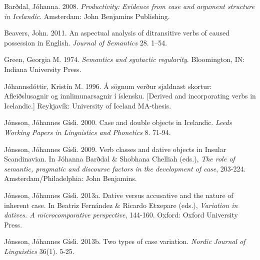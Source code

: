 \begin{styleStandard}
Barðdal, Jóhanna. 2008. \textit{Productivity: Evidence from case and argument structure in Icelandic}. Amsterdam: John Benjamins Publishing. 
\end{styleStandard}

\begin{styleStandard}
Beavers, John. 2011. An aspectual analysis of ditransitive verbs of caused possession in English. \textit{Journal of Semantics }28. 1–54.
\end{styleStandard}

\begin{styleStandard}
Green, Georgia M. 1974. \textit{Semantics and syntactic regularity}. Bloomington, IN: Indiana University Press.
\end{styleStandard}

\begin{styleStandard}
Jóhannsdóttir, Kristín M. 1996. Á sögnum verður sjaldnast skortur: Afleiðslusagnir og innlimunarsagnir í íslensku. [Derived and incorporating verbs in Icelandic.] Reykjavík: University of Iceland MA-thesis. 
\end{styleStandard}

\begin{styleStandard}
Jónsson, Jóhannes Gísli. 2000. Case and double objects in Icelandic. \textit{Leeds Working Papers in Linguistics and Phonetics }8. 71-94.
\end{styleStandard}

\begin{styleStandard}
Jónsson, Jóhannes Gísli. 2009. Verb classes and dative objects in Insular Scandinavian. In Jóhanna Barðdal \& Shobhana Chelliah (eds.),\textit{ The role of semantic, pragmatic and discourse factors in the development of case}, 203-224. Amsterdam/Philadelphia: John Benjamins.
\end{styleStandard}

\begin{styleStandard}
Jónsson, Jóhannes Gísli. 2013a. Dative versus accusative and the nature of inherent case. In Beatriz Fernández \& Ricardo Etxepare (eds.), \textit{Variation in datives. A microcomparative perspective}, 144-160. Oxford: Oxford University Press. 
\end{styleStandard}

\begin{styleStandard}
Jónsson, Jóhannes Gísli. 2013b. Two types of case variation. \textit{Nordic Journal of Linguistics} 36(1). 5-25.
\end{styleStandard}

